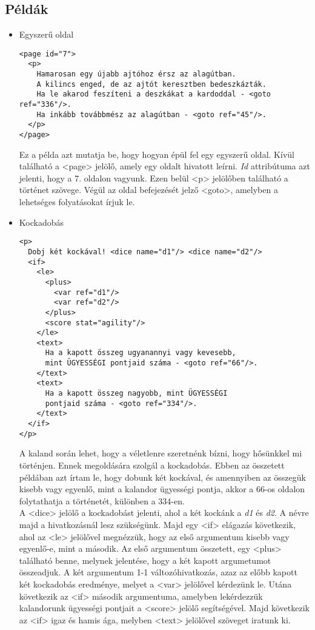\documentclass[12pt,a4paper,oneside]{report}
\newcommand{\attr}{\emph}
\begin{document}
    \subsection{Példák}
    \begin{itemize}
      \item Egyszerű oldal
        \begin{verbatim}
<page id="7">
  <p>
    Hamarosan egy újabb ajtóhoz érsz az alagútban.
    A kilincs enged, de az ajtót keresztben bedeszkázták.
    Ha le akarod feszíteni a deszkákat a kardoddal - <goto ref="336"/>.
    Ha inkább továbbmész az alagútban - <goto ref="45"/>.
  </p>
</page>
      \end{verbatim}
      Ez a példa azt mutatja be, hogy hogyan épül fel egy egyszerű
      oldal. Kívül található a <{\color{Tag}page}> jelölő, amely egy
      oldalt hivatott leírni. \attr{Id} attribútuma azt jelenti, hogy a
      7. oldalon vagyunk. Ezen belül <{\color{Tag}p}> jelölőben
      található a történet szövege. Végül az oldal befejezését jelző
      <{\color{Tag}goto}>, amelyben a lehetséges folyatásokat írjuk
      le.
      \item Kockadobás
      
        \begin{verbatim}
<p>
  Dobj két kockával! <dice name="d1"/> <dice name="d2"/>
  <if>
    <le>
      <plus>
        <var ref="d1"/>
        <var ref="d2"/>
      </plus>
      <score stat="agility"/>
    </le>
    <text>
      Ha a kapott összeg ugyanannyi vagy kevesebb,
      mint ÜGYESSÉGI pontjaid száma - <goto ref="66"/>.
    </text>
    <text>
      Ha a kapott összeg nagyobb, mint ÜGYESSÉGI
      pontjaid száma - <goto ref="334"/>.
    </text>
  </if>
</p>
        \end{verbatim}
        A kaland során lehet, hogy a véletlenre szeretnénk bízni, hogy
        hősünkkel mi történjen. Ennek megoldására szolgál a
        kockadobás. Ebben az összetett példában azt írtam le, hogy
        dobunk két kockával, és amennyiben az összegük kisebb vagy
        egyenlő, mint a kalandor ügyességi pontja, akkor a 66-os oldalon
        folytathatja a történetét, különben a 334-en.\\
        A <{\color{Tag}dice}> jelölő a
        kockadobást jelenti, ahol a két kockánk a \emph{d1} és \emph{d2}. A névre majd
        a hivatkozásnál lesz szükségünk. Majd egy <{\color{Tag}if}> elágazás
        következik, ahol az <{\color{Tag}le}> jelölővel megnézzük, hogy az első
        argumentum kisebb vagy egyenlő-e, mint a második. Az első
        argumentum összetett, egy <{\color{Tag}plus}> található benne, melynek
        jelentése, hogy a két kapott argumetumot összeadjuk. A két
        argumentum 1-1 változóhivatkozás, azaz az előbb kapott két
        kockadobás eredménye, melyet a <{\color{Tag}var}> jelölővel kérdezünk
        le. Utána következik az <{\color{Tag}if}> második argumentuma, amelyben
        lekérdezzük kalandorunk ügyességi pontjait a <{\color{Tag}score}> jelölő
        segítségével. Majd következik az <{\color{Tag}if}> igaz és hamis ága, melyben
        <{\color{Tag}text}> jelölővel szöveget iratunk ki.
      

\end{itemize}
\end{document}
